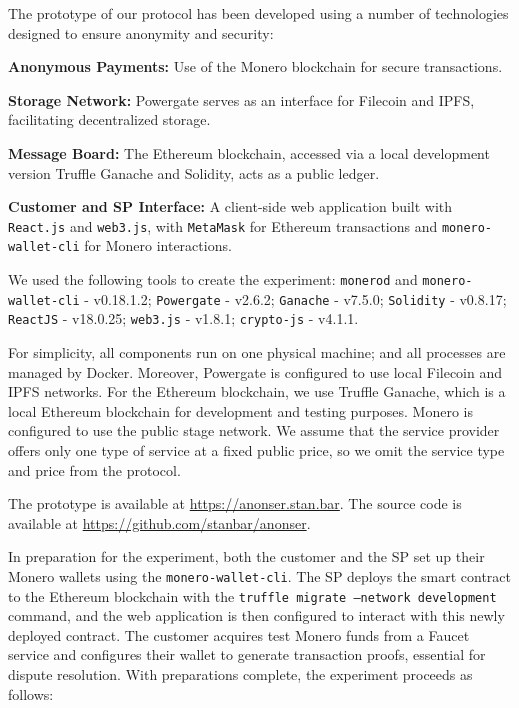 \documentclass[pdftex,twocolumn,epjc3]{svjour3}
\begin{document}
The prototype of our protocol has been developed using a number of technologies designed to ensure anonymity and security:
\begin{itemize}
\begin{sloppypar}
  \item \textbf{Anonymous Payments:} Use of the Monero blockchain for secure transactions.
\end{sloppypar}
  \item \textbf{Storage Network:} Powergate serves as an interface for Filecoin and IPFS, facilitating decentralized storage.
  \item \textbf{Message Board:} The Ethereum blockchain, accessed via a local development version Truffle Ganache and Solidity, acts as a public ledger.
  \item \textbf{Customer and SP Interface:} A client-side web application built with \texttt{React.js} and \texttt{web3.js}, with \texttt{MetaMask} for Ethereum transactions and \texttt{monero-wallet-cli} for Monero interactions.
\end{itemize}

We used the following tools to create the experiment:
\texttt{monerod} and \texttt{monero-wallet-cli} - v0.18.1.2; \texttt{Powergate} - v2.6.2; \texttt{Ganache} - v7.5.0; \texttt{Solidity} - v0.8.17; \texttt{ReactJS} - v18.0.25; \texttt{web3.js} - v1.8.1; \texttt{crypto-js} - v4.1.1.

For simplicity, all components run on one physical machine; and all processes are managed by Docker. 
Moreover, Powergate is configured to use local Filecoin and IPFS networks.
For the Ethereum blockchain, we use Truffle Ganache, which is a local Ethereum blockchain for development and testing purposes. 
Monero is configured to use the public stage network.
We assume that the service provider offers only one type of service at a fixed public price, so we omit the service type and price from the protocol.

The prototype is available at \url{https://anonser.stan.bar}. The source code is available at \url{https://github.com/stanbar/anonser}.

In preparation for the experiment, both the customer and the SP set up their Monero wallets using the \texttt{monero-wallet-cli}. The SP deploys the smart contract to the Ethereum blockchain with the \texttt{truffle migrate --network development} command, and the web application is then configured to interact with this newly deployed contract.
The customer acquires test Monero funds from a Faucet service and configures their wallet to generate transaction proofs, essential for dispute resolution.
With preparations complete, the experiment proceeds as follows:
\end{document}
